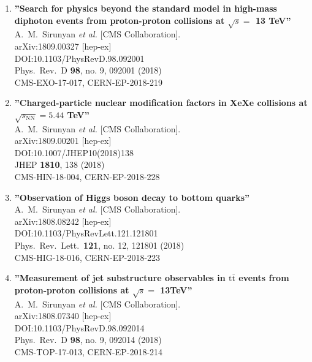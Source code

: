 \begin{enumerate}
\item%
{\bf ''Search for physics beyond the standard model in high-mass diphoton events from proton-proton collisions at $\sqrt{s} =$ 13 TeV''}
  \\{}A.~M.~Sirunyan {\it et al.} [CMS Collaboration].
  \\{}arXiv:1809.00327 [hep-ex]
  \\{}DOI:10.1103/PhysRevD.98.092001
  \\{}Phys.\ Rev.\ D {\bf 98}, no. 9, 092001 (2018)
  \\{}CMS-EXO-17-017, CERN-EP-2018-219

\item%
{\bf ''Charged-particle nuclear modification factors in XeXe collisions at $ \sqrt{s_{\mathrm{NN}}} = 5.44 $ TeV''}
  \\{}A.~M.~Sirunyan {\it et al.} [CMS Collaboration].
  \\{}arXiv:1809.00201 [hep-ex]
  \\{}DOI:10.1007/JHEP10(2018)138
  \\{}JHEP {\bf 1810}, 138 (2018)
  \\{}CMS-HIN-18-004, CERN-EP-2018-228

\item%
{\bf ''Observation of Higgs boson decay to bottom quarks''}
  \\{}A.~M.~Sirunyan {\it et al.} [CMS Collaboration].
  \\{}arXiv:1808.08242 [hep-ex]
  \\{}DOI:10.1103/PhysRevLett.121.121801
  \\{}Phys.\ Rev.\ Lett.\  {\bf 121}, no. 12, 121801 (2018)
  \\{}CMS-HIG-18-016, CERN-EP-2018-223

\item%
{\bf ''Measurement of jet substructure observables in $\mathrm{t\overline{t}}$ events from proton-proton collisions at $\sqrt{s}=$ 13TeV''}
  \\{}A.~M.~Sirunyan {\it et al.} [CMS Collaboration].
  \\{}arXiv:1808.07340 [hep-ex]
  \\{}DOI:10.1103/PhysRevD.98.092014
  \\{}Phys.\ Rev.\ D {\bf 98}, no. 9, 092014 (2018)
  \\{}CMS-TOP-17-013, CERN-EP-2018-214


\end{enumerate}
